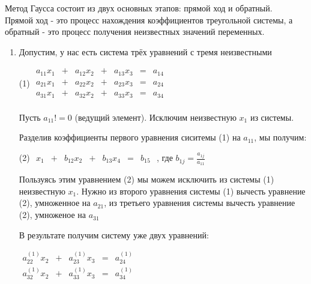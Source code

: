 \documentclass[12pt,letterpaper]{article}
\begin{document}
Метод Гаусса состоит из двух основных этапов: прямой ход и обратный. \\
Прямой ход - это процесс нахождения коэффициентов треугольной системы, а обратный - это процесс получения неизвестных значений
переменных.
\begin{enumerate}
\section*{Прямой ход}



\item Допустим, у нас есть система трёх уравнений с тремя неизвестными

(1)  $\begin{array}{lcccccc}
		a_{11}x_{1} &+& a_{12}x_{2} &+& a_{13}x_{3} &=& a_{14}\\
		a_{21}x_{1} &+& a_{22}x_{2} &+& a_{23}x_{3} &=& a_{24}\\ 
		a_{31}x_{1} &+& a_{32}x_{2} &+& a_{33}x_{3} &=& a_{34}\\
\end{array}$

Пусть $a_{11} != 0$ (ведущий элемент). Исключим неизвестную $x_{1}$ из системы.

Разделив коэффициенты первого уравнения сиситемы (1) на $a_{11}$, мы получим:
\begin{center}
    (2) $\begin{array}{lcccccc}
        x_{1} &+& b_{12}x_2 &+& b_{13}x_4 &=& b_{15}
    \end{array}$ , где $b_{1j} = \frac{a_{1j}}{a_{11}}$
    \end{center}

Пользуясь этим уравнением (2) мы можем исключить из системы (1) неизвестную $x_1$. Нужно из второго уравнения системы (1) вычесть уравнение (2), умноженное на $a_{21}$, из третьего уравнения системы вычесть уравнение (2), умноженое на $a_{31}$

В результате получим систему уже двух уравнений:
\begin{center}
    $\begin{array}{lcccc}
		a_{22}^{(1)}x_{2} &+& a_{23}^{(1)}x_{3} &=& a_{24}^{(1)} \\ 
		a_{32}^{(1)}x_{2} &+& a_{33}^{(1)}x_{3} &=& a_{34}^{(1)} \\
\end{array}$
\end{center}


\end{enumerate}
\end{document}
